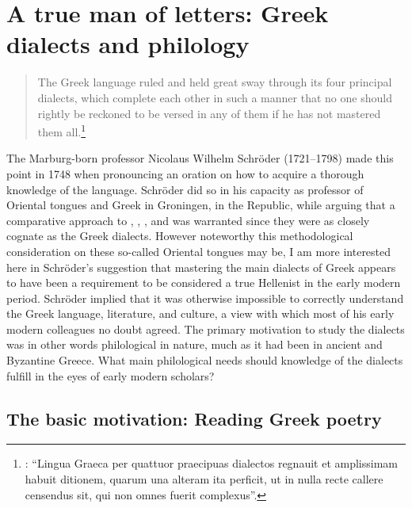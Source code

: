 \chapter{A true man of letters: Greek dialects and philology}

\label{chap:3}
\begin{quote}
The Greek language ruled and held great sway through its four principal dialects, which complete each other in such a manner that no one should rightly be reckoned to be versed in any of them if he has not mastered them all.\footnote{\citet[53--54]{Schroeder1748}: “Lingua Graeca per quattuor praecipuas dialectos regnauit et amplissimam habuit ditionem, quarum una alteram ita perficit, ut in nulla recte callere censendus sit, qui non omnes fuerit complexus”.}
\end{quote}

The Marburg-born professor Nicolaus Wilhelm Schröder (1721–1798) made this point in 1748 when pronouncing an oration on how to acquire a thorough knowledge of the  language. Schröder did so in his capacity as professor of Oriental tongues and Greek in Groningen, in the  Republic, while arguing that a comparative approach to , , , and  was warranted since they were as closely cognate as the Greek dialects. However noteworthy this methodological consideration on these so-called Oriental tongues may be, I am more interested here in Schröder’s suggestion that mastering the main dialects of Greek appears to have been a requirement to be considered a true Hellenist in the early modern period. Schröder implied that it was otherwise impossible to correctly understand the Greek language, literature, and culture, a view with which most of his early modern colleagues no doubt agreed. The primary motivation to study the dialects was in other words philological in nature, much as it had been in ancient and Byzantine Greece. What main philological needs should knowledge of the dialects fulfill in the eyes of early modern scholars?

\section{The basic motivation: Reading Greek poetry}\label{sec:3.1}

